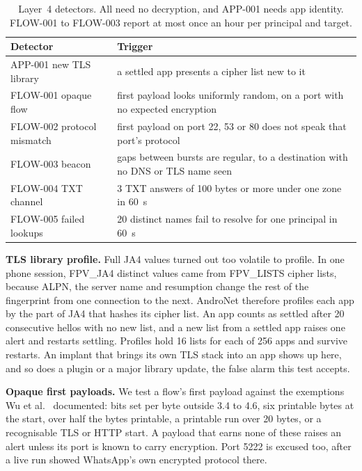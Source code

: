 \documentclass[runningheads]{llncs}
\begin{document}
\begin{table}[t]
\centering
\caption{Layer~4 detectors. All need no decryption, and APP-001 needs app identity. FLOW-001 to FLOW-003 report at most once an hour per principal and target.}\label{tab:l4}
\small
\begin{tabular}{@{}lp{}@{}}
\toprule
Detector & Trigger \\
\midrule
APP-001 new TLS library & a settled app presents a cipher list new to it \\
FLOW-001 opaque flow & first payload looks uniformly random, on a port with no expected encryption \\
FLOW-002 protocol mismatch & first payload on port 22, 53 or 80 does not speak that port's protocol \\
FLOW-003 beacon & gaps between bursts are regular, to a destination with no DNS or TLS name seen \\
FLOW-004 TXT channel & 3 TXT answers of 100 bytes or more under one zone in 60~s \\
FLOW-005 failed lookups & 20 distinct names fail to resolve for one principal in 60~s \\
\bottomrule
\end{tabular}
\end{table}

\textbf{TLS library profile.} Full JA4 values turned out too volatile to profile. In one phone session, {{FPV_JA4}} distinct values came from {{FPV_LISTS}} cipher lists, because ALPN, the server name and resumption change the rest of the fingerprint from one connection to the next. AndroNet therefore profiles each app by the part of JA4 that hashes its cipher list. An app counts as settled after 20 consecutive hellos with no new list, and a new list from a settled app raises one alert and restarts settling. Profiles hold 16 lists for each of 256 apps and survive restarts. An implant that brings its own TLS stack into an app shows up here, and so does a plugin or a major library update, the false alarm this test accepts.

\textbf{Opaque first payloads.} We test a flow's first payload against the exemptions Wu et al.~\cite{wu2023} documented: bits set per byte outside 3.4 to 4.6, six printable bytes at the start, over half the bytes printable, a printable run over 20 bytes, or a recognisable TLS or HTTP start. A payload that earns none of these raises an alert unless its port is known to carry encryption. Port 5222 is excused too, after a live run showed WhatsApp's own encrypted protocol there.
\end{document}
